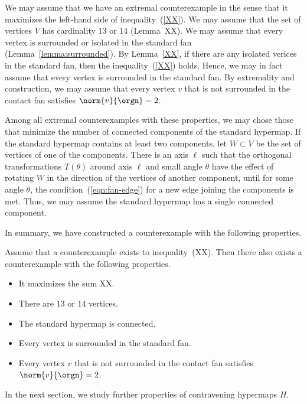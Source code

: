 We may assume that we have an extremal counterexample
in the sense that it maximizes the left-hand side of inequality~(\ref{XX}).  We may assume that the set of vertices $V$ has cardinality $13$ or $14$ (Lemma~{XX}).
We may assume that every vertex is surrounded or isolated in
the standard fan (Lemma~\ref{lemma:surrounded}).  By Lemma~\ref{XX}, if there are any isolated verices in the standard fan, then the inequality~(\ref{XX}) holds.  Hence, we may in fact assume that every vertex is surrounded in the standard fan.
By extremality and construction, we may assume that every vertex $v$ that is not surrounded in the contact fan satisfies $\norm{v}{\orgn}=2$.

Among all extremal counterexamples with these properties,
we may chose those that minimize the number of connected components
of the standard hypermap.
If the standard hypermap contains at least two components, let $W\subset V$ be the set of vertices of one of the components.  There is an axis $\ell$ such that the orthogonal transformations $T(\theta)$ around axis $\ell$ and small angle $\theta$  have the effect of rotating $W$ in the direction of the vertices of another component, until for some angle $\theta$, the condition~(\ref{eqn:fan-edge}) for
a new edge joining the components is met.  Thus, we may assume the standard hypermap has a single connected component.

In summary, we have constructed a counterexample with the following properties.

\begin{lemma} Assume that a counterexample exists to inequality~(XX).  Then there also exists a counterexample with the following properties.
\begin{itemize}
\item It maximizes the sum XX.
\item There are $13$ or $14$ vertices.
\item The standard hypermap is connected.
\item Every vertex is surrounded in the standard fan.
\item Every vertex $v$ that is not surrounded in the contact
fan satisfies $\norm{v}{\orgn}=2$.
\end{itemize}
\end{lemma}







In the next section, we study further properties of contravening hypermaps $H$.





